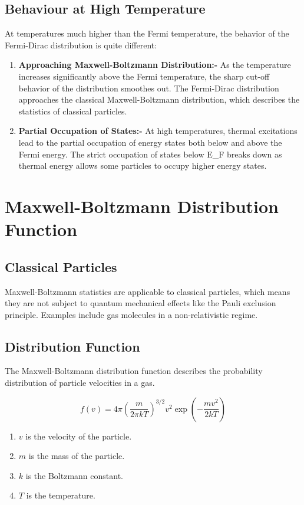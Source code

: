 \documentclass{article}
\begin{document}
\subsection*{Behaviour at High Temperature}
At temperatures much higher than the Fermi temperature, the behavior of the
Fermi-Dirac distribution is quite different:

\begin{enumerate}
    \item \textbf{Approaching Maxwell-Boltzmann Distribution:-} As the temperature increases significantly above the Fermi temperature, the sharp cut-off behavior of the distribution smoothes out. The Fermi-Dirac distribution approaches the classical Maxwell-Boltzmann distribution, which describes the statistics of classical particles.
    \item \textbf{Partial Occupation of States:-} At high temperatures, thermal excitations lead to the partial occupation of energy states both below and above the Fermi energy. The strict occupation of states below E\_F breaks down as thermal energy allows some particles to occupy higher energy states.
\end{enumerate}

\section{Maxwell-Boltzmann Distribution Function}
\subsection*{Classical Particles}
Maxwell-Boltzmann statistics are applicable to classical particles, which means
they are not subject to quantum mechanical effects like the Pauli exclusion
principle. Examples include gas molecules in a non-relativistic regime.

\subsection*{Distribution Function}
The Maxwell-Boltzmann distribution function describes the probability
distribution of particle velocities in a gas.

\begin{equation}
    f(v)=4\pi(\frac{m}{2\pi kT})^{3/2} v^2\exp(-\frac{mv^2}{2kT})
\end{equation}

\begin{enumerate}
    \item $v$ is the velocity of the particle.
    \item $m$ is the mass of the particle.
    \item $k$ is the Boltzmann constant.
    \item $T$ is the temperature.
\end{enumerate}
\end{document}
